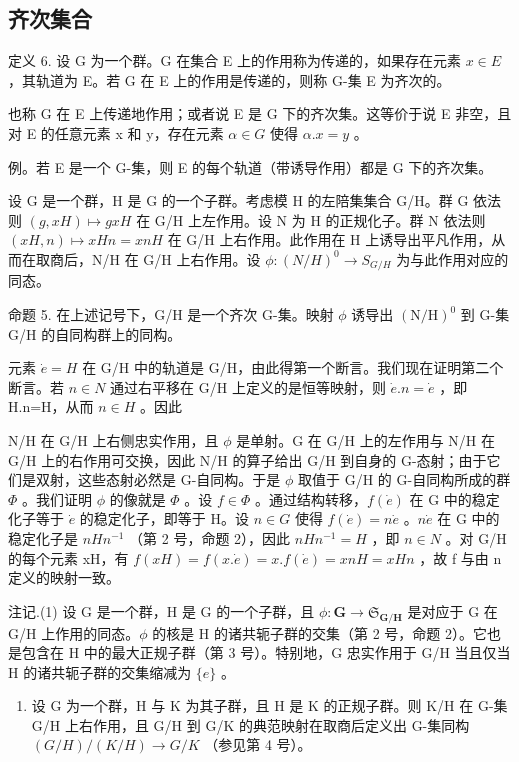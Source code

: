 \subsection{齐次集合}

定义 6. 设 G 为一个群。G 在集合 E 上的作用称为传递的，如果存在元素 \(x \in E\) ，其轨道为 E。若 G 在 E 上的作用是传递的，则称 G-集 E 为齐次的。

也称 G 在 E 上传递地作用；或者说 E 是 G 下的齐次集。这等价于说 E 非空，且对 E 的任意元素 x 和 y，存在元素 \(\alpha \in G\) 使得 \(\alpha.x = y\) 。

例。若 E 是一个 G-集，则 E 的每个轨道（带诱导作用）都是 G 下的齐次集。

设 G 是一个群，H 是 G 的一个子群。考虑模 H 的左陪集集合 G/H。群 G 依法则 \((g, xH) \mapsto gxH\) 在 G/H 上左作用。设 N 为 H 的正规化子。群 N 依法则 \((xH, n) \mapsto xHn = xnH\) 在 G/H 上右作用。此作用在 H 上诱导出平凡作用，从而在取商后，N/H 在 G/H 上右作用。设 \(\phi: (N/H)^{0} \to S_{G/H}\) 为与此作用对应的同态。

命题 5. 在上述记号下，G/H 是一个齐次 G-集。映射 \(\phi\) 诱导出 \((\mathrm{N} / \mathrm{H})^0\) 到 G-集 G/H 的自同构群上的同构。

元素 \(\dot{e}=H\) 在 G/H 中的轨道是 G/H，由此得第一个断言。我们现在证明第二个断言。若 \(n\in N\) 通过右平移在 G/H 上定义的是恒等映射，则 \(\dot{e}.n=\dot{e}\) ，即 H.n=H，从而 \(n\in H\) 。因此

N/H 在 G/H 上右侧忠实作用，且 \(\phi\) 是单射。G 在 G/H 上的左作用与 N/H 在 G/H 上的右作用可交换，因此 N/H 的算子给出 G/H 到自身的 G-态射；由于它们是双射，这些态射必然是 G-自同构。于是 \(\phi\) 取值于 G/H 的 G-自同构所成的群 \(\Phi\) 。我们证明 \(\phi\) 的像就是 \(\Phi\) 。设 \(f \in \Phi\) 。通过结构转移，\(f(\dot{e})\) 在 G 中的稳定化子等于 \(\dot{e}\) 的稳定化子，即等于 H。设 \(n \in G\) 使得 \(f(\dot{e}) = n\dot{e}\) 。\(n\dot{e}\) 在 G 中的稳定化子是 \(nHn^{-1}\) （第 2 号，命题 2），因此 \(nHn^{-1} = H\) ，即 \(n \in N\) 。对 G/H 的每个元素 xH，有 \(f(xH) = f(x.\dot{e}) = x.f(\dot{e}) = xnH = xHn\) ，故 f 与由 n 定义的映射一致。

注记.(1) 设 G 是一个群，H 是 G 的一个子群，且 \(\phi: \mathbf{G} \to \mathfrak{S}_{\mathbf{G}/\mathbf{H}}\) 是对应于 G 在 G/H 上作用的同态。\(\phi\) 的核是 H 的诸共轭子群的交集（第 2 号，命题 2）。它也是包含在 H 中的最大正规子群（第 3 号）。特别地，G 忠实作用于 G/H 当且仅当 H 的诸共轭子群的交集缩减为 \(\{e\}\) 。

\begin{enumerate}
\def\labelenumi{(\arabic{enumi})}
\setcounter{enumi}{1}
\tightlist
\item
  设 G 为一个群，H 与 K 为其子群，且 H 是 K 的正规子群。则 K/H 在 G-集 G/H 上右作用，且 G/H 到 G/K 的典范映射在取商后定义出 G-集同构 \((G/H)/(K/H) \rightarrow G/K\) （参见第 4 号）。
\end{enumerate}

